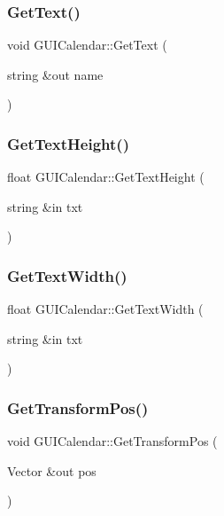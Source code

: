 \subsubsection{\texorpdfstring{Get\+Text()}{GetText()}}
{\footnotesize\ttfamily void G\+U\+I\+Calendar\+::\+Get\+Text (\begin{DoxyParamCaption}\item[{string \&out}]{name }\end{DoxyParamCaption})}

\hypertarget{class_g_u_i_calendar_a8f8326ea981b8ef7c81fbd87e014bdbb}{}\label{class_g_u_i_calendar_a8f8326ea981b8ef7c81fbd87e014bdbb} 
\subsubsection{\texorpdfstring{Get\+Text\+Height()}{GetTextHeight()}}
{\footnotesize\ttfamily float G\+U\+I\+Calendar\+::\+Get\+Text\+Height (\begin{DoxyParamCaption}\item[{string \&in}]{txt }\end{DoxyParamCaption})}

\hypertarget{class_g_u_i_calendar_ae4aee018f624f73f0038255b7254b50d}{}\label{class_g_u_i_calendar_ae4aee018f624f73f0038255b7254b50d} 
\subsubsection{\texorpdfstring{Get\+Text\+Width()}{GetTextWidth()}}
{\footnotesize\ttfamily float G\+U\+I\+Calendar\+::\+Get\+Text\+Width (\begin{DoxyParamCaption}\item[{string \&in}]{txt }\end{DoxyParamCaption})}

\hypertarget{class_g_u_i_calendar_a1dcf963cf9dcdb69201d522640c2a553}{}\label{class_g_u_i_calendar_a1dcf963cf9dcdb69201d522640c2a553} 
\subsubsection{\texorpdfstring{Get\+Transform\+Pos()}{GetTransformPos()}}
{\footnotesize\ttfamily void G\+U\+I\+Calendar\+::\+Get\+Transform\+Pos (\begin{DoxyParamCaption}\item[{Vector \&out}]{pos }\end{DoxyParamCaption})}

